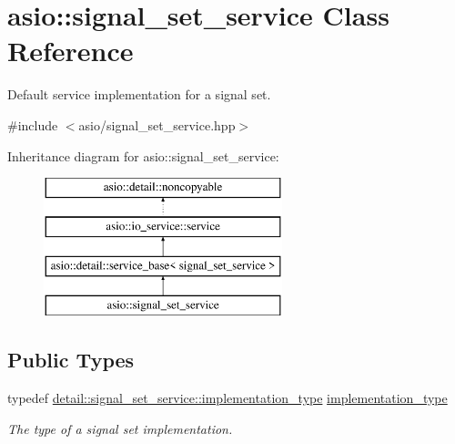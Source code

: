 \hypertarget{classasio_1_1signal__set__service}{}\section{asio\+:\+:signal\+\_\+set\+\_\+service Class Reference}
\label{classasio_1_1signal__set__service}


Default service implementation for a signal set.  




{\ttfamily \#include $<$asio/signal\+\_\+set\+\_\+service.\+hpp$>$}

Inheritance diagram for asio\+:\+:signal\+\_\+set\+\_\+service\+:\begin{figure}[H]
\begin{center}
\leavevmode
\includegraphics[height=4.000000cm]{classasio_1_1signal__set__service}
\end{center}
\end{figure}
\subsection*{Public Types}
\begin{DoxyCompactItemize}
\item 
typedef \hyperlink{classasio_1_1detail_1_1signal__set__service_1_1implementation__type}{detail\+::signal\+\_\+set\+\_\+service\+::implementation\+\_\+type} \hyperlink{classasio_1_1signal__set__service_a15c9b1c4bf96f3491eb2e8e30b5a483a}{implementation\+\_\+type}
\begin{DoxyCompactList}\small\item\em The type of a signal set implementation. \end{DoxyCompactList}\end{DoxyCompactItemize}
